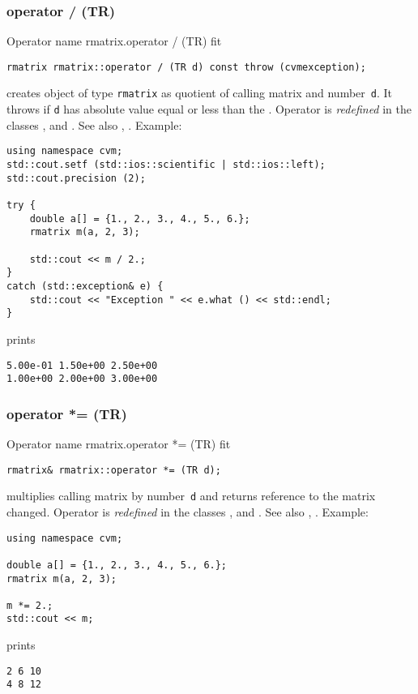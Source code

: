 \subsubsection{operator / (TR)}
Operator%
\pdfdest name {rmatrix.operator / (TR)} fit
\begin{verbatim}
rmatrix rmatrix::operator / (TR d) const throw (cvmexception);
\end{verbatim}
creates  object of type \verb"rmatrix" as  quotient of
 calling matrix and  number~\verb"d". It throws
if \verb"d" has  absolute value equal or less than the
.
Operator is \emph{redefined} in the classes
, 
and .
See also ,
.
Example:
\begin{Verbatim}
using namespace cvm;
std::cout.setf (std::ios::scientific | std::ios::left);
std::cout.precision (2);

try {
    double a[] = {1., 2., 3., 4., 5., 6.};
    rmatrix m(a, 2, 3);

    std::cout << m / 2.;
}
catch (std::exception& e) {
    std::cout << "Exception " << e.what () << std::endl;
}
\end{Verbatim}
prints
\begin{Verbatim}
5.00e-01 1.50e+00 2.50e+00
1.00e+00 2.00e+00 3.00e+00
\end{Verbatim}
\newpage



\subsubsection{operator *= (TR)}
Operator%
\pdfdest name {rmatrix.operator *= (TR)} fit
\begin{verbatim}
rmatrix& rmatrix::operator *= (TR d);
\end{verbatim}
multiplies  calling matrix by  number~\verb"d"
and returns  reference to
the matrix changed.
Operator is \emph{redefined} in the classes
, 
and .
See also ,
.
Example:
\begin{Verbatim}
using namespace cvm;

double a[] = {1., 2., 3., 4., 5., 6.};
rmatrix m(a, 2, 3);

m *= 2.;
std::cout << m;
\end{Verbatim}
prints
\begin{Verbatim}
2 6 10
4 8 12
\end{Verbatim}
\newpage



